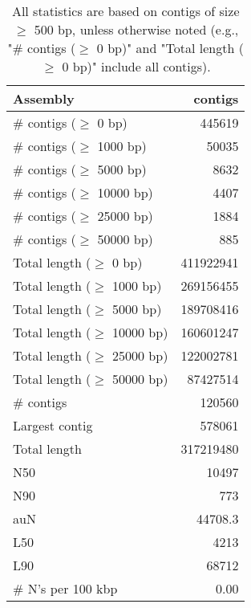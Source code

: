 \documentclass[12pt,a4paper]{article}
\begin{document}
\begin{table}[ht]
\begin{center}
\caption{All statistics are based on contigs of size $\geq$ 500 bp, unless otherwise noted (e.g., "\# contigs ($\geq$ 0 bp)" and "Total length ($\geq$ 0 bp)" include all contigs).}
\begin{tabular}{|l*{1}{|r}|}
\hline
Assembly & contigs \\ \hline
\# contigs ($\geq$ 0 bp) & 445619 \\ \hline
\# contigs ($\geq$ 1000 bp) & 50035 \\ \hline
\# contigs ($\geq$ 5000 bp) & 8632 \\ \hline
\# contigs ($\geq$ 10000 bp) & 4407 \\ \hline
\# contigs ($\geq$ 25000 bp) & 1884 \\ \hline
\# contigs ($\geq$ 50000 bp) & 885 \\ \hline
Total length ($\geq$ 0 bp) & 411922941 \\ \hline
Total length ($\geq$ 1000 bp) & 269156455 \\ \hline
Total length ($\geq$ 5000 bp) & 189708416 \\ \hline
Total length ($\geq$ 10000 bp) & 160601247 \\ \hline
Total length ($\geq$ 25000 bp) & 122002781 \\ \hline
Total length ($\geq$ 50000 bp) & 87427514 \\ \hline
\# contigs & 120560 \\ \hline
Largest contig & 578061 \\ \hline
Total length & 317219480 \\ \hline
N50 & 10497 \\ \hline
N90 & 773 \\ \hline
auN & 44708.3 \\ \hline
L50 & 4213 \\ \hline
L90 & 68712 \\ \hline
\# N's per 100 kbp & 0.00 \\ \hline
\end{tabular}
\end{center}
\end{table}
\end{document}
